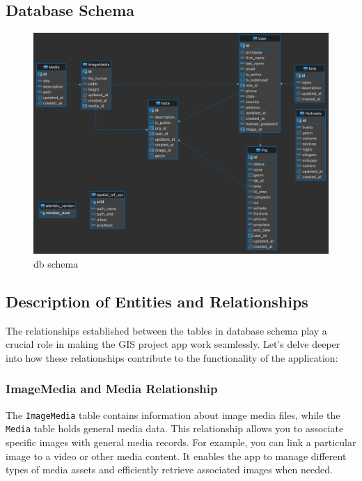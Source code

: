 \subsection{Database Schema}\label{subsec:database-schema}
\begin{figure}[H]
    \includegraphics[width=\textwidth]{res/db_schema}
    \caption{db schema}
    \label{fig:dbschema}
\end{figure}

\subsection{Description of Entities and Relationships}\label{subsec:database-entity-relationship}
The relationships established between the tables in database schema play a crucial role in making the GIS project app work seamlessly. Let's delve deeper into how these relationships contribute to the functionality of the application:

\subsubsection{ImageMedia and Media Relationship}
The \texttt{ImageMedia} table contains information about image media files, while the \texttt{Media} table holds general media data. This relationship allows you to associate specific images with general media records. For example, you can link a particular image to a video or other media content. It enables the app to manage different types of media assets and efficiently retrieve associated images when needed.

